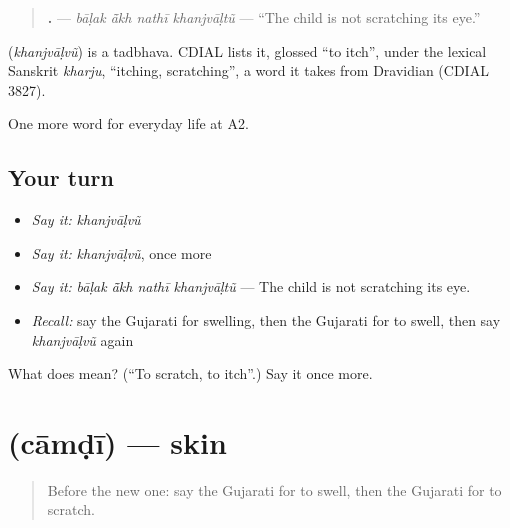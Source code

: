 \begin{quote}
\textbf{   .} — \emph{bāḷak ā̃kh nathī khanjvāḷtũ} — \textquotedblleft{}The child is not scratching its eye.\textquotedblright{}
\end{quote}

\begin{cousinweb}
\textbf{} (\emph{khanjvāḷvũ}) is a tadbhava. CDIAL lists it, glossed \textquotedblleft{}to itch\textquotedblright{}, under the lexical Sanskrit \emph{kharju}, \textquotedblleft{}itching, scratching\textquotedblright{}, a word it takes from Dravidian (CDIAL 3827).
\end{cousinweb}

\begin{grammarlens}[title={What you've built}]
One more word for everyday life at A2.
\end{grammarlens}

\subsection*{Your turn}
\begin{itemize}
\raggedright
  \item \emph{Say it:} \emph{khanjvāḷvũ}
  \item \emph{Say it:} \emph{khanjvāḷvũ}, once more
  \item \emph{Say it:} \emph{bāḷak ā̃kh nathī khanjvāḷtũ} — The child is not scratching its eye.
  \item \emph{Recall:} say the Gujarati for swelling, then the Gujarati for to swell, then say \emph{khanjvāḷvũ} again
\end{itemize}

\begin{tcolorbox}[breakable,colback=teal!4,colframe=teal!35!black,title={Before you move on}]
What does  mean? (\textquotedblleft{}To scratch, to itch\textquotedblright{}.) Say it once more.
\end{tcolorbox}
\section[\texorpdfstring{\gu{ચામડી} (cāmḍī)}{ચામડી (cāmḍī)}]{ (cāmḍī) — skin}

\label{lesson:GU-C228-camdi}



\begin{quote}
Before the new one: say the Gujarati for to swell, then the Gujarati for to scratch.
\end{quote}

